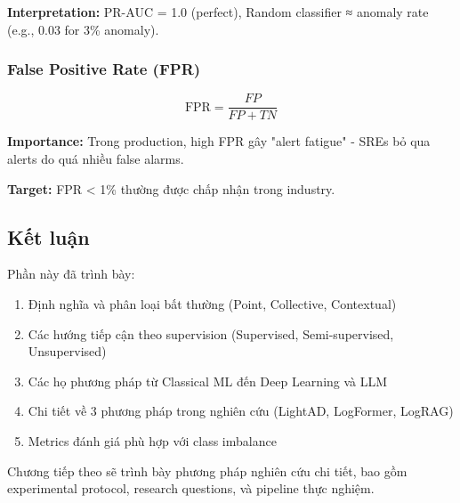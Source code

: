 \textbf{Interpretation:} PR-AUC = 1.0 (perfect), Random classifier ≈ anomaly rate (e.g., 0.03 for 3\% anomaly).

\subsubsection{False Positive Rate (FPR)}

\begin{equation}
\text{FPR} = \frac{FP}{FP + TN}
\label{eq:fpr}
\end{equation}

\textbf{Importance:} Trong production, high FPR gây "alert fatigue" - SREs bỏ qua alerts do quá nhiều false alarms.

\textbf{Target:} FPR < 1\% thường được chấp nhận trong industry.

\subsection{Kết luận}
\label{subsec:anomaly-conclusion}

Phần này đã trình bày:
\begin{enumerate}
    \item Định nghĩa và phân loại bất thường (Point, Collective, Contextual)
    \item Các hướng tiếp cận theo supervision (Supervised, Semi-supervised, Unsupervised)
    \item Các họ phương pháp từ Classical ML đến Deep Learning và LLM
    \item Chi tiết về 3 phương pháp trong nghiên cứu (LightAD, LogFormer, LogRAG)
    \item Metrics đánh giá phù hợp với class imbalance
\end{enumerate}

Chương tiếp theo sẽ trình bày phương pháp nghiên cứu chi tiết, bao gồm experimental protocol, research questions, và pipeline thực nghiệm.
